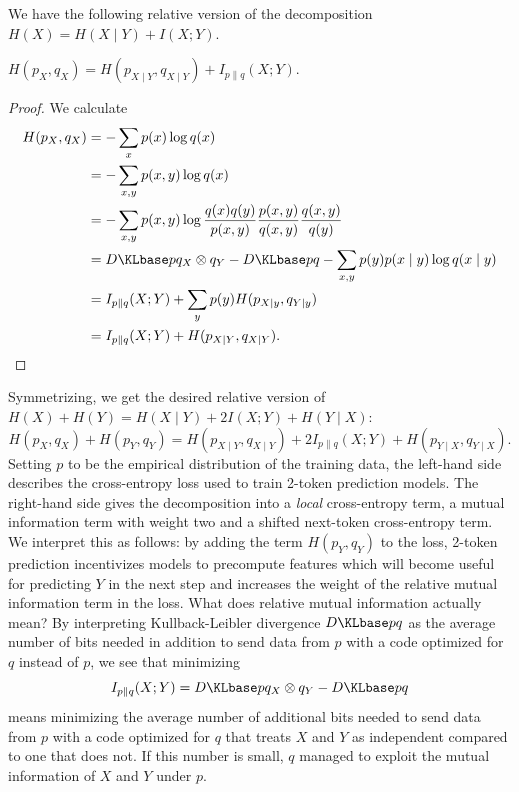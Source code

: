 We have the following relative version of the decomposition $H(X) = H(X \mid Y) + I(X; Y)$.
\begin{lemma}
    $H(p_X, q_X) = H(p_{X \mid Y}, q_{X \mid Y}) + I_{p \| q}(X; Y).$
\end{lemma}
\begin{proof}
We calculate
\begin{align*}
    H(p_X, q_X)
    &= -\sum_x p(x) \log q(x) \\
    &= -\sum_{x,y} p(x, y) \log q(x) \\
    &= -\sum_{x,y} p(x, y) \log \frac{q(x)q(y)}{p(x, y)}\frac{p(x, y)}{q(x, y)}\frac{q(x, y)}{q(y)}  \\
    &= \KL{p}{q_X \otimes q_Y} - \KL{p}{q} - \sum_{x,y} p(y) p(x \mid y) \log q(x \mid y) \\
    &= I_{p \| q}(X; Y) + \sum_y p(y) H(p_{X\mid y}, q_{Y\mid y}) \\
    &= I_{p \| q}(X; Y) + H(p_{X \mid Y}, q_{X \mid Y}).
\end{align*}
\end{proof}
Symmetrizing, we get the desired relative version of $H(X) + H(Y) = H(X \mid Y) + 2 I(X; Y) + H(Y \mid X)$:
\[
    H(p_X, q_X) + H(p_Y, q_Y)
    = H(p_{X \mid Y}, q_{X \mid Y}) + 2 I_{p \| q}(X; Y) + H(p_{Y \mid X}, q_{Y \mid X}).
\]
Setting $p$ to be the empirical distribution of the training data, the left-hand side describes the cross-entropy loss used to train 2-token prediction models. The right-hand side gives the decomposition into a \emph{local} cross-entropy term, a mutual information term with weight two and a shifted next-token cross-entropy term. We interpret this as follows: by adding the term $H(p_Y, q_Y)$ to the loss, 2-token prediction incentivizes models to precompute features which will become useful for predicting $Y$ in the next step and increases the weight of the relative mutual information term in the loss. What does relative mutual information actually mean? By interpreting Kullback-Leibler divergence $\KL{p}{q}$ as the average number of bits needed in addition to send data from $p$ with a code optimized for $q$ instead of $p$, we see that minimizing
\[
I_{p \| q}(X; Y) = \KL{p}{q_X \otimes q_Y} - \KL{p}{q}
\]
means minimizing the average number of additional bits needed to send data from $p$ with a code optimized for $q$ that treats $X$ and $Y$ as independent compared to one that does not. If this number is small, $q$ managed to exploit the mutual information of $X$ and $Y$ under $p$.





